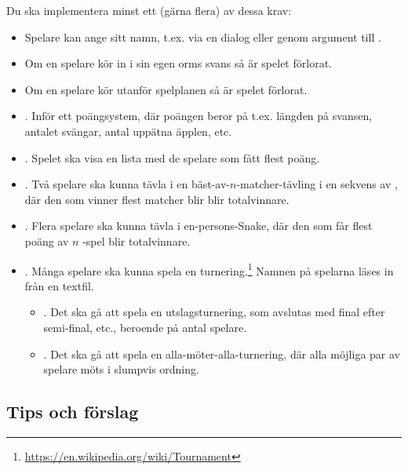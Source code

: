 Du ska implementera minst ett (gärna flera) av dessa krav:
\begin{itemize}[nosep, label={$\square$}]
\item Spelare kan ange sitt namn, t.ex. via en dialog eller genom argument till .
\item Om en spelare kör in i sin egen orms svans så är spelet förlorat. %
\item Om en spelare kör utanför spelplanen så är spelet förlorat. %
\item \textbf{}. Inför ett poängsystem, där poängen beror på t.ex. längden på svansen, antalet svängar, antal uppätna äpplen, etc.
\item \textbf{}. Spelet ska visa en lista med de spelare som fått flest poäng.

\item \textbf{}. Två spelare ska kunna tävla i en bäst-av-$n$-matcher-tävling i en sekvens av , där den som vinner flest matcher blir blir totalvinnare.

\item \textbf{}. Flera spelare ska kunna tävla i en-persons-Snake, där den som får flest poäng av $n$ -spel blir totalvinnare.


\item \textbf{}. Många spelare ska kunna spela en turnering.\footnote{\url{https://en.wikipedia.org/wiki/Tournament}} Namnen på spelarna läses in från en textfil.
\begin{itemize}[nosep, label={$\square$}]
\item \textbf{}. Det ska gå att spela en utslagsturnering, som avslutas med final efter semi-final, etc., beroende på antal spelare.
\item \textbf{}. Det ska gå att spela en alla-möter-alla-turnering, där alla möjliga par av spelare möts i slumpvis ordning.
\end{itemize}

\end{itemize}


\subsection{Tips och förslag}\label{lab:snake:tips}

